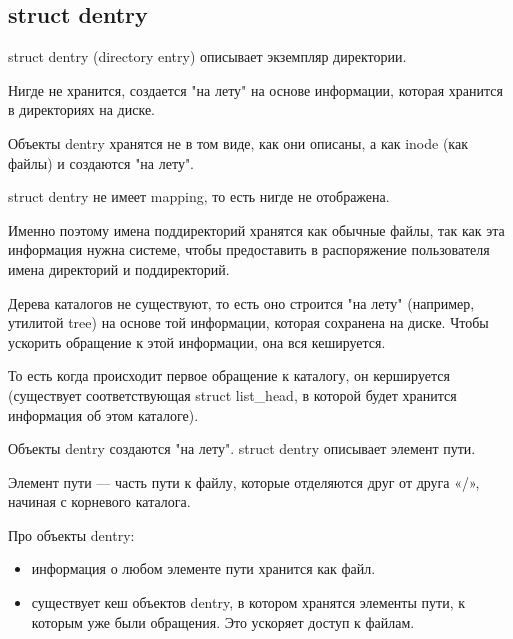 \subsection{struct dentry}

struct dentry (directory entry) описывает экземпляр директории.

Нигде не хранится, создается "на лету" на основе информации, которая хранится в директориях на диске.

Объекты dentry хранятся не в том виде, как они описаны, а как inode (как файлы) и создаются "на лету".

struct dentry не имеет mapping, то есть нигде не отображена.

Именно поэтому имена поддиректорий хранятся как обычные файлы, так как эта информация нужна системе, чтобы предоставить в распоряжение пользователя имена директорий и поддиректорий.

Дерева каталогов не существуют, то есть оно строится "на лету" (например, утилитой tree) на основе той информации, которая сохранена на диске. Чтобы ускорить обращение к этой информации, она вся кешируется.

То есть когда происходит первое обращение к каталогу, он кершируется (существует соответствующая struct list\_head, в которой будет хранится информация об этом каталоге).

Объекты dentry создаются "на лету". struct dentry описывает элемент пути.

Элемент пути — часть пути к файлу, которые отделяются друг от друга «/», начиная с корневого каталога.

Про объекты dentry:
\begin{itemize}
\item  информация о любом элементе пути хранится как файл.
\item существует кеш объектов dentry, в котором хранятся элементы пути, к которым уже были обращения. Это ускоряет доступ к файлам.
\end{itemize}

